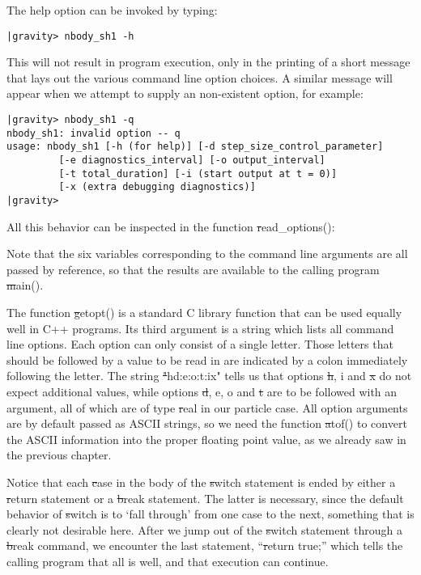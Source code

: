 The help option can be invoked by typing:

\begin{small}
\begin{verbatim}
|gravity> nbody_sh1 -h
\end{verbatim}
\end{small}

This will not result in program execution, only in the printing of a
short message that lays out the various command line option choices.
A similar message will appear when we attempt to supply an
non-existent option, for example:

\begin{small}
\begin{verbatim}
|gravity> nbody_sh1 -q
nbody_sh1: invalid option -- q
usage: nbody_sh1 [-h (for help)] [-d step_size_control_parameter]
         [-e diagnostics_interval] [-o output_interval]
         [-t total_duration] [-i (start output at t = 0)]
         [-x (extra debugging diagnostics)]
|gravity> 
\end{verbatim}
\end{small}

All this behavior can be inspected in the function {\st read\_options()}:


Note that the six variables corresponding to the command line arguments
are all passed by reference, so that the results are available to the
calling program {\st main()}.

The function {\st getopt()} is a standard C library function that can
be used equally well in C++ programs.  Its third argument is a string
which lists all command line options.  Each option can only consist of
a single letter.  Those letters that should be followed by a value to
be read in are indicated by a colon immediately following the letter.
The string {\st "hd:e:o:t:ix"} tells us that options {\st h, i} and
{\st x} do not expect additional values, while options {\st d, e, o}
and {\st t} are to be followed with an argument, all of which are of
type {\st real} in our particle case.  All option arguments are by
default passed as ASCII strings, so we need the function {\st atof()}
to convert the ASCII information into the proper floating point value,
as we already saw in the previous chapter.

Notice that each {\st case} in the body of the {\st switch} statement
is ended by either a {\st return} statement or a {\st break} statement.
The latter is necessary, since the default behavior of {\st switch} is
to `fall through' from one case to the next, something that is clearly
not desirable here.  After we jump out of the {\st switch} statement
through a {\st break} command, we encounter the last statement,
``{\st return true;}'' which tells the calling program that all is well,
and that execution can continue.

